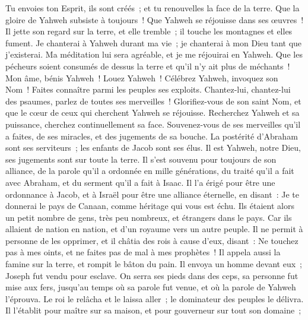 \begin{multicols}{2}
Tu envoies ton Esprit, ils sont créés~; et tu renouvelles la face de la terre.
Que la gloire de Yahweh subsiste à toujours~! Que Yahweh se réjouisse dans ses œuvres~!
Il jette son regard sur la terre, et elle tremble~; il touche les montagnes et elles fument.
Je chanterai à Yahweh durant ma vie~; je chanterai à mon Dieu tant que j'existerai.
Ma méditation lui sera agréable, et je me réjouirai en Yahweh.
Que les pécheurs soient consumés de dessus la terre et qu'il n'y ait plus de méchants~! Mon âme, bénis Yahweh~! Louez Yahweh~!
\VerseOne{}Célébrez Yahweh, invoquez son Nom~! Faites connaître parmi les peuples ses exploits.
Chantez-lui, chantez-lui des psaumes, parlez de toutes ses merveilles~!
Glorifiez-vous de son saint Nom, et que le cœur de ceux qui cherchent Yahweh se réjouisse.
Recherchez Yahweh et sa puissance, cherchez continuellement sa face.
Souvenez-vous de ses merveilles qu'il a faites, de ses miracles, et des jugements de sa bouche.
La postérité d'Abraham sont ses serviteurs~; les enfants de Jacob sont ses élus.
Il est Yahweh, notre Dieu, ses jugements sont sur toute la terre.
Il s'est souvenu pour toujours de son alliance, de la parole qu'il a ordonnée en mille générations,
du traité qu'il a fait avec Abraham, et du serment qu'il a fait à Isaac.
Il l'a érigé pour être une ordonnance à Jacob, et à Israël pour être une alliance éternelle,
en disant~: Je te donnerai le pays de Canaan, comme héritage qui vous est échu.
Ils étaient alors un petit nombre de gens, très peu nombreux, et étrangers dans le pays.
Car ils allaient de nation en nation, et d'un royaume vers un autre peuple.
Il ne permit à personne de les opprimer, et il châtia des rois à cause d'eux,
disant~: Ne touchez pas à mes oints, et ne faites pas de mal à mes prophètes~!
Il appela aussi la famine sur la terre, et rompit le bâton du pain.
Il envoya un homme devant eux~; Joseph fut vendu pour esclave.
On serra ses pieds dans des ceps, sa personne fut mise aux fers,
jusqu'au temps où sa parole fut venue, et où la parole de Yahweh l'éprouva.
Le roi le relâcha et le laissa aller~; le dominateur des peuples le délivra.
Il l'établit pour maître sur sa maison, et pour gouverneur sur tout son domaine~;

\end{multicols}
